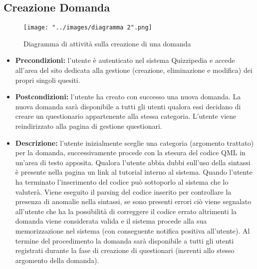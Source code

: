 \subsection{Creazione Domanda}
\begin{figure}[h!]
\begin{center}
	\centerline{\texttt{[image: "../images/diagramma 2".png]}}
	\caption{Diagramma di attività sulla creazione di una domanda}
\end{center}
\end{figure}
\begin{itemize}
\item\textbf{Precondizioni:} l'utente è autenticato nel sistema Quizzipedia e accede all'area del sito dedicata alla gestione (creazione, eliminazione e modifica) dei propri singoli quesiti.
\item\textbf{Postcondizioni:} l'utente ha creato con successo una nuova domanda. La nuova domanda sarà disponibile a tutti gli utenti qualora essi decidano di creare un questionario appartenente alla stessa categoria. L'utente viene reindirizzato alla pagina di gestione questionari. %
\item\textbf{Descrizione:} l'utente inizialmente sceglie una categoria (argomento trattato) per la domanda, successivamente procede con la stesura del codice QML in un'area di testo apposita. Qualora l'utente abbia dubbi sull'uso della sintassi è presente nella pagina un link al tutorial interno al sistema. Quando l'utente ha terminato l'inserimento del codice può sottoporlo al sistema che lo valuterà. Viene eseguito il parsing del codice inserito per controllare la presenza di anomalie nella sintassi, se sono presenti errori ciò viene segnalato all'utente che ha la possibilità di correggere il codice errato altrimenti la domanda viene considerata valida e il sistema procede alla sua memorizzazione nel sistema (con conseguente notifica positiva all'utente). Al termine del procedimento la domanda sarà disponibile a tutti gli utenti registrati durante la fase di creazione di questionari (inerenti allo stesso argomento della domanda).
\end{itemize}
\newpage
